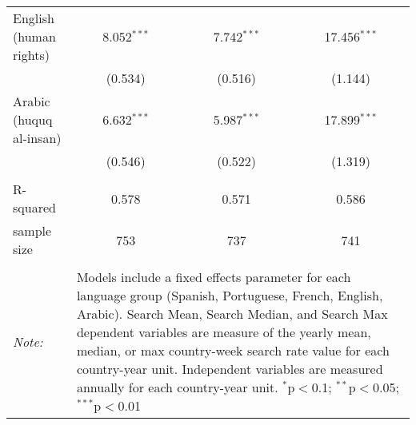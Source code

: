 \begin{table}[!htbp]
\begin{tabular}{@{\extracolsep{5pt}}lccc}
  English (human rights) & 8.052$^{***}$ & 7.742$^{***}$ & 17.456$^{***}$ \\ 
  & (0.534) & (0.516) & (1.144) \\ 
  Arabic (huquq al-insan) & 6.632$^{***}$ & 5.987$^{***}$ & 17.899$^{***}$ \\ 
  & (0.546) & (0.522) & (1.319) \\ 
 \hline \\[-1.8ex] 
R-squared  & 0.578 & 0.571 & 0.586 \\ 
sample size  & 753 & 737 & 741 \\ 
\hline 
\hline \\[-1.8ex] 
\textit{Note:}  & \multicolumn{3}{l}{\parbox[t]{8cm}{Models include a fixed effects parameter for each language group (Spanish, Portuguese, French, English, Arabic). Search Mean, Search Median, and Search Max dependent variables are measure of the yearly mean, median, or max country-week search rate value for each country-year unit. Independent variables are measured annually for each country-year unit. $^{*}$p$<$0.1; $^{**}$p$<$0.05; $^{***}$p$<$0.01}} \\ 
\end{tabular} 
\end{table} 
